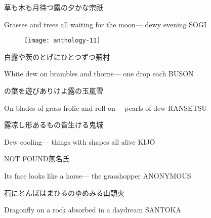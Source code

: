 \begin{haiku}
    {\FH 草も木も月待つ露の夕かな}\hfill{\FH 宗祇}

    \vin{} Grasses and trees all
    \vin{} \vin{} waiting for the moon---
    \vin{} \vin{} \vin{} dewy evening \hspace{\fill} S\={O}GI
\end{haiku}

\begin{figure}
    \texttt{[image: anthology-11]}
\end{figure}

\begin{haiku}
    {\FH 白露や茨のとげにひとつずつ}\hfill{\FH 蕪村}

    \vin{} White dew
    \vin{} \vin{} on brambles and thorns---
    \vin{} \vin{} \vin{} one drop each \hspace{\fill} BUSON
\end{haiku}

\begin{haiku}
    {\FH {}の葉を遊びありけよ露の玉}\hfill{\FH 嵐雪}

    \vin{} On blades of grass
    \vin{} \vin{} frolic and roll on---
    \vin{} \vin{} \vin{} pearls of dew \hspace{\fill} RANSETSU
\end{haiku}

\begin{haiku}
    {\FH 露凉し形あるもの皆生ける}\hfill{\FH 鬼城}

    \vin{} Dew cooling---
    \vin{} \vin{} things with shapes
    \vin{} \vin{} \vin{} all alive \hspace{\fill} KIJ\={O}
\end{haiku}

\begin{haiku}
    NOT FOUND\hfill{\FH 無名氏}

    \vin{} Its face
    \vin{} \vin{} looks like a horse---
    \vin{} \vin{} \vin{} the grasshopper \hspace{\fill} ANONYMOUS
\end{haiku}

\begin{haiku}
    {\FH 石にとんぼはまひるのゆめみる}\hfill{\FH 山頭火}

    \vin{} Dragonfly on a rock
    \vin{} \vin{} absorbed in
    \vin{} \vin{} \vin{} a daydream \hspace{\fill} SANT\={O}KA
\end{haiku}

